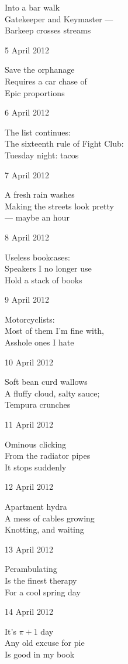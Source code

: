 \documentclass[12pt]{article}
\begin{document}
Into a bar walk \\
Gatekeeper and Keymaster --- \\
Barkeep crosses streams

5 April 2012

Save the orphanage \\
Requires a car chase of \\
Epic proportions

6 April 2012

The list continues: \\
The sixteenth rule of Fight Club: \\
Tuesday night: tacos

7 April 2012

A fresh rain washes \\
Making the streets look pretty \\
--- maybe an hour

8 April 2012 

Useless bookcases: \\
Speakers I no longer use \\
Hold a stack of books 

9 April 2012

Motorcyclists: \\
Most of them I'm fine with, \\
Asshole ones I hate

\newpage

10 April 2012

Soft bean curd wallows \\
A fluffy cloud, salty sauce; \\
Tempura crunches

11 April 2012

Ominous clicking \\
From the radiator pipes \\
It stops suddenly

12 April 2012

Apartment hydra \\
A mess of cables growing \\
Knotting, and waiting

13 April 2012

Perambulating \\
Is the finest therapy \\
For a cool spring day

14 April 2012

It's $\pi + 1$ day \\
Any old excuse for pie \\
Is good in my book
\end{document}
